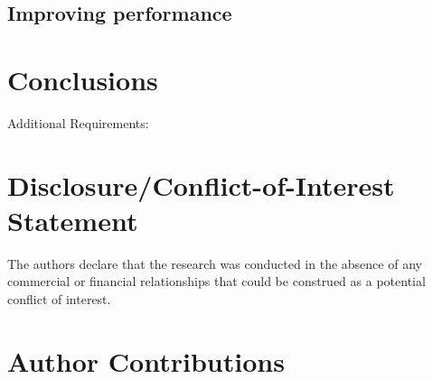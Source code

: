 \documentclass{frontiersSCNS} %
\begin{document}
\subsection{Improving performance}

\section{Conclusions}

Additional Requirements:

\section*{Disclosure/Conflict-of-Interest Statement}

The authors declare that the research was conducted in the absence of any commercial or financial relationships that could be construed as a potential conflict of interest.

\section*{Author Contributions}
\end{document}
